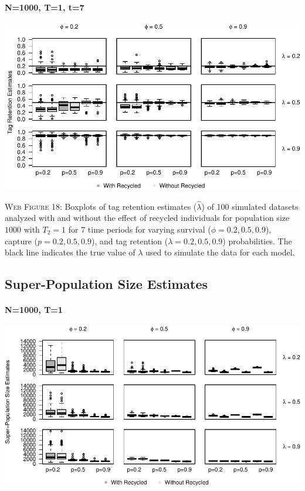 \documentclass[]{article}
\let\oldparagraph\paragraph
\renewcommand{\paragraph}[1]{\oldparagraph{#1}\mbox{}}
\begin{document}
\paragraph{N=1000, T=1, t=7}\label{n1000-t1-t7-2}

\includegraphics{Appendix_BW_files/figure-latex/figure18_tagretention_GJSTL6-1.pdf}

\textsc{Web Figure 18:} Boxplots of tag retention estimates
(\(\hat{\lambda}\)) of 100 simulated datasets analyzed with and without
the effect of recycled individuals for population size \(1000\) with
\(T_2=1\) for 7 time periods for varying survival
(\(\phi=0.2,0.5,0.9\)), capture (\(p=0.2,0.5,0.9\)), and tag retention
(\(\lambda=0.2,0.5,0.9\)) probabilities. The black line indicates the
true value of \(\lambda\) used to simulate the data for each model.

\newpage

\subsection{Super-Population Size
Estimates}\label{super-population-size-estimates}

\paragraph{N=1000, T=1}\label{n1000-t1-3}

\includegraphics{Appendix_BW_files/figure-latex/figure19_superN_GJSTL1-1.pdf}
\end{document}
